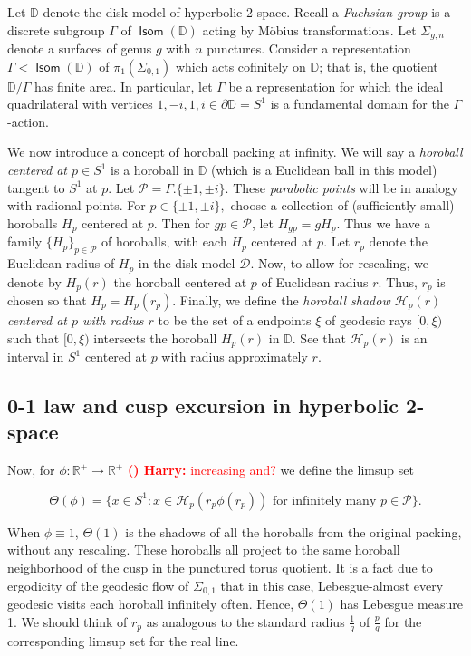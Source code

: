 \documentclass[11pt]{amsart}
\theoremstyle{plain}
\theoremstyle{definition}
\theoremstyle{remark}
\DeclareMathOperator{\Isom}{\mathsf{Isom}}
\DeclareMathOperator{\PSL}{\mathsf{PSL}}
\newcounter{countharry}
\newcommand{\comharry}[1]{{\textcolor{red}{\textrm{{\bf (\arabic{countharry})\stepcounter{countharry} Harry:} #1}}}}
\begin{document}
Let $\mathbb D$ denote the disk model of hyperbolic 2-space. 
Recall a { \em  Fuchsian group} is a discrete subgroup $\Gamma$ of 
$\Isom(\mathbb D)$ acting by 
M\"obius transformations. Let
$\Sigma_{g,n}$ denote a surfaces of genus $g$ with $n$ punctures. Consider a
representation 
$\Gamma<\Isom(\mathbb D) $
of $\pi_1(\Sigma_{0,1})$ which
acts cofinitely on $\mathbb D$; that is, the quotient $\mathbb
D/\Gamma$ has finite area. In particular, let $\Gamma$ 
be a representation for which 
the ideal quadrilateral with vertices
$1,-i,1,i\in\partial \mathbb D=S^1$ is a fundamental domain for the
$\Gamma$-action. 


We now introduce a concept of horoball packing at infinity. 
We will say a {\em horoball centered at $p\in S^1$} is a horoball in
$\mathbb D$ (which is a Euclidean ball in this model) tangent to $S^1$ at
$p$. 
Let $\mathcal P=\Gamma.\{\pm1,\pm i\}$. These {\em parabolic points} will be
in analogy with radional points.
For $p\in \{\pm 1,\pm i\},$ choose a collection of (sufficiently small)
horoballs $H_p$ centered at $p$. Then for $gp\in\mathcal P$, let
$H_{gp}=gH_p$. Thus we have a family $\{H_p\}_{p\in\mathcal P}$ of
horoballs, with each $H_p$ centered at $p$. Let $r_p$ denote the
Euclidean radius of $H_p$ in the disk model $\mathcal D$.
Now, to allow for rescaling, we denote by $H_p(r)$ the horoball centered at
$p$ of Euclidean radius $r$. Thus, $r_p$ is chosen so that
$H_p=H_p(r_p)$. Finally, we define the {\em horoball shadow $\mathcal
H_p(r)$ centered at $p$ with radius $r$} to be the set of a endpoints
$\xi$ of
geodesic rays $[0,\xi)$ such that $[0,\xi)$ intersects the horoball
$H_p(r)$ in $\mathbb D$. See that $\mathcal H_p(r)$ is an
interval in $S^1$ centered at $p$ with radius approximately $r$. 

\subsection{0-1 law and cusp excursion in hyperbolic 2-space}
Now, for $\phi\colon\mathbb R^+\to\mathbb R^+$ \comharry{increasing and?}
we define the limsup set

\[
  \Theta(\phi)=\{x\in S^1 : x\in\mathcal H_p(r_p\phi(r_p)) \text{ for
  infinitely many }p\in\mathcal P\}. 
\]

When $\phi\equiv 1$, $\Theta(1)$ is the shadows of all the horoballs from
the original packing, without any rescaling. These horoballs all project to
the same horoball neighborhood of the cusp in the punctured torus quotient. 
It is a fact due to ergodicity
of the geodesic flow of $\Sigma_{0,1}$ 
that in this case, Lebesgue-almost every geodesic visits each
horoball infinitely often. Hence, $\Theta(1)$ has Lebesgue measure 1. We 
should think of $r_p$ as analogous to the standard radius $\frac1q$ of
$\frac{p}q$ for the corresponding limsup set for the real line. 
\end{document}
